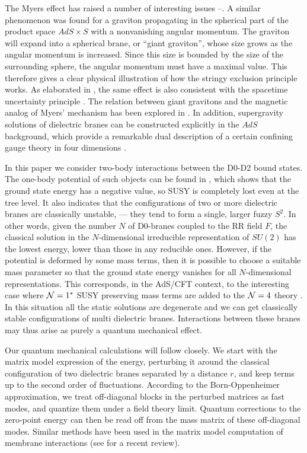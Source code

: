 \documentclass[a4paper,12pt]{article}
\begin{document}
The Myers effect has raised a number of interesting issues \cite{MST}--\cite{GR}. A similar phenomenon was found \cite{MST} for a graviton propagating in the spherical part of the product space $AdS\times S$ with a nonvanishing angular momentum. The graviton will expand into a spherical brane, or ``giant graviton'', whose size grows as the angular momentum is increased. Since this size is bounded by the size of the surrounding sphere, the angular momentum must have a maximal value. This therefore gives a clear physical illustration of how the stringy exclusion principle \cite{MS} works. As elaborated in \cite{Miao}, the same effect is also consistent with the spacetime uncertainty principle \cite{JYMY}. The relation between giant gravitons and the magnetic analog of Myers' mechanism has been explored in \cite{DTV}. In addition, supergravity solutions of dielectric branes can be constructed explicitly in the $AdS$ background, which provide a remarkable dual description of a certain confining gauge theory in four dimensions \cite{PS}. 

In this paper we consider two-body interactions between the D0-D2 bound states. The one-body potential of such objects can be found in \cite{Myers}, which shows that the ground state energy has a negative value, so SUSY is completely lost even at the tree level. It also indicates that the configurations of two or more dielectric branes are classically unstable, --- they tend to form a single, larger fuzzy $S^{2}$. In other words, given the number $N$ of D0-branes coupled to the RR field $F$, the classical solution in the $N$-dimensional irreducible representation of $SU(2)$ has the lowest energy, lower than those in any reducible ones. However, if the potential is deformed by some mass terms, then it is possible to choose a suitable mass parameter so that the ground state energy vanishes for all $N$-dimensional representations. This corresponds, in the AdS/CFT context, to the interesting case where ${\cal N}=1^{*}$  SUSY preserving mass terms are added to the ${\cal N}=4$ theory \cite{PS}. In this situation all the static solutions are degenerate and we can get classically stable configurations of multi dielectric branes. Interactions between these branes may thus arise as purely a quantum mechanical effect.

Our quantum mechanical calculations will follow \cite{AB} closely. We start with the matrix model expression of the energy, perturbing it around the classical configuration of two dielectric branes separated by a distance $r$, and keep terms up to the second order of fluctuations. According to the Born-Oppenheimer approximation, we treat off-diagonal blocks in the perturbed matrices as fast modes, and quantize them under a field theory limit. Quantum corrections to the zero-point energy can then be read off from the mass matrix of these off-diagonal modes. Similar methods have been used in the matrix model computation of membrane interactions \cite{AB} \cite{LM} \cite{TR97} (see \cite{Taylor} for a recent review).
\end{document}
